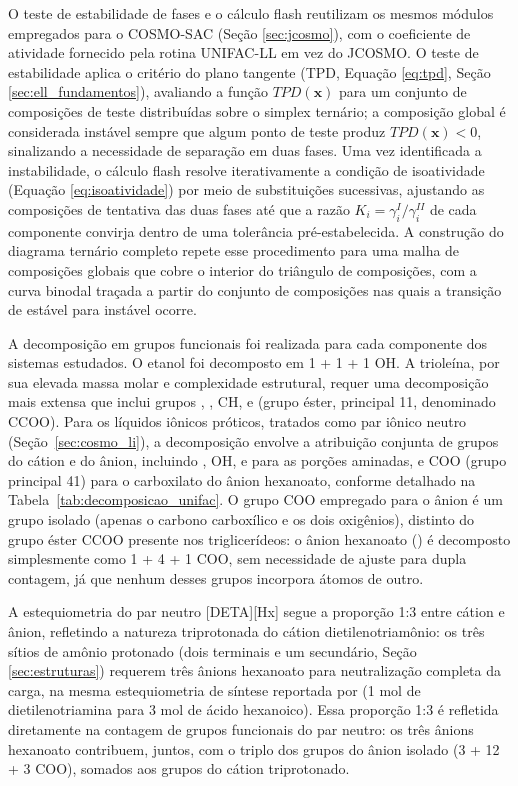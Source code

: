 O teste de estabilidade de fases e o cálculo flash reutilizam os mesmos módulos empregados para o COSMO-SAC (Seção \ref{sec:jcosmo}), com o coeficiente de atividade fornecido pela rotina UNIFAC-LL em vez do JCOSMO. O teste de estabilidade aplica o critério do plano tangente (TPD, Equação \ref{eq:tpd}, Seção \ref{sec:ell_fundamentos}), avaliando a função $TPD(\mathbf{x})$ para um conjunto de composições de teste distribuídas sobre o simplex ternário; a composição global é considerada instável sempre que algum ponto de teste produz $TPD(\mathbf{x}) < 0$, sinalizando a necessidade de separação em duas fases. Uma vez identificada a instabilidade, o cálculo flash resolve iterativamente a condição de isoatividade (Equação \ref{eq:isoatividade}) por meio de substituições sucessivas, ajustando as composições de tentativa das duas fases até que a razão $K_i = \gamma_i^{I}/\gamma_i^{II}$ de cada componente convirja dentro de uma tolerância pré-estabelecida. A construção do diagrama ternário completo repete esse procedimento para uma malha de composições globais que cobre o interior do triângulo de composições, com a curva binodal traçada a partir do conjunto de composições nas quais a transição de estável para instável ocorre.

A decomposição em grupos funcionais foi realizada para cada componente dos sistemas estudados. O etanol foi decomposto em 1  + 1  + 1 OH. A trioleína, por sua elevada massa molar e complexidade estrutural, requer uma decomposição mais extensa que inclui grupos , , CH,  e  (grupo éster, principal 11, denominado CCOO). Para os líquidos iônicos próticos, tratados como par iônico neutro (Seção~\ref{sec:cosmo_li}), a decomposição envolve a atribuição conjunta de grupos do cátion e do ânion, incluindo , OH,  e  para as porções aminadas, e COO (grupo principal 41) para o carboxilato do ânion hexanoato, conforme detalhado na Tabela~\ref{tab:decomposicao_unifac}. O grupo COO empregado para o ânion é um grupo isolado (apenas o carbono carboxílico e os dois oxigênios), distinto do grupo éster CCOO presente nos triglicerídeos: o ânion hexanoato () é decomposto simplesmente como 1  + 4  + 1 COO, sem necessidade de ajuste para dupla contagem, já que nenhum desses grupos incorpora átomos de outro.

A estequiometria do par neutro [DETA][Hx] segue a proporção 1:3 entre cátion e ânion, refletindo a natureza triprotonada do cátion dietilenotriamônio: os três sítios de amônio protonado (dois terminais e um secundário, Seção \ref{sec:estruturas}) requerem três ânions hexanoato para neutralização completa da carga, na mesma estequiometria de síntese reportada por  (1 mol de dietilenotriamina para 3 mol de ácido hexanoico). Essa proporção 1:3 é refletida diretamente na contagem de grupos funcionais do par neutro: os três ânions hexanoato contribuem, juntos, com o triplo dos grupos do ânion isolado (3  + 12  + 3 COO), somados aos grupos do cátion triprotonado.

